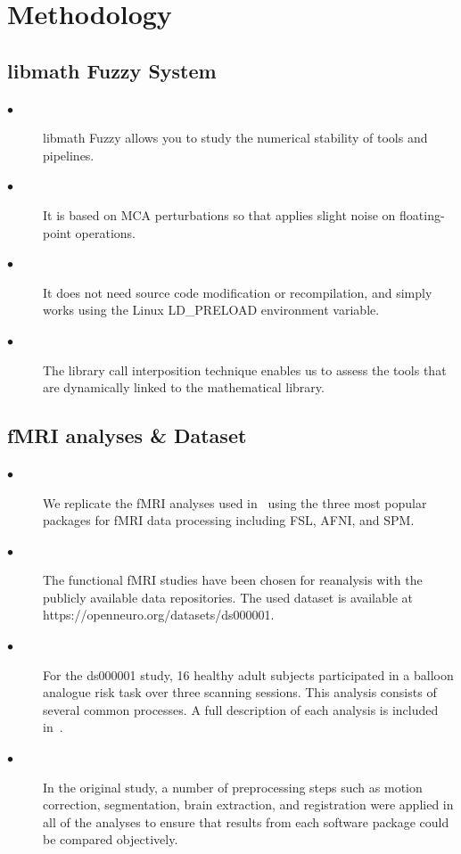 \documentclass[runningheads]{llncs}
\begin{document}
\section{Methodology}

\subsection{libmath Fuzzy System}

\begin{description}
  \item[$\bullet$ ] libmath Fuzzy allows you to study the numerical stability of tools and pipelines. 
  \item[$\bullet$ ] It is based on MCA perturbations so that applies slight noise on floating-point operations.
  \item[$\bullet$ ] It does not need source code modification or recompilation, and simply works using the Linux LD\_PRELOAD environment variable.
  \item[$\bullet$ ] The library call interposition technique enables us to assess the tools that are dynamically linked to the mathematical library.
\end{description} 


\subsection{fMRI analyses \& Dataset}

\begin{description}
  \item[$\bullet$ ] We replicate the fMRI analyses used in~\cite{bowring2019exploring} using the three most popular packages 
                    for fMRI data processing including FSL, AFNI, and SPM. 
                    
  \item[$\bullet$ ] The functional fMRI studies have been chosen for reanalysis with the publicly available data repositories.
                    The used dataset is available at https://openneuro.org/datasets/ds000001.

  \item[$\bullet$ ] For the ds000001 study, 16 healthy adult subjects participated in a balloon analogue risk task over three scanning sessions.
                    This analysis consists of several common processes. A full description of each analysis is included in~\cite{bowring2019exploring}.

  \item[$\bullet$ ] In the original study, a number of preprocessing steps such as motion correction, segmentation, brain extraction, and registration 
                    were applied in all of the analyses to ensure that results from each software package could be compared objectively.
  
\end{description}  
\end{document}
